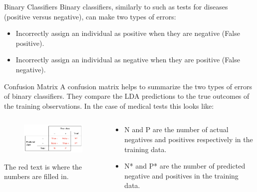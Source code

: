 \documentclass[
  ignorenonframetext,
  aspectratio=169,
]{beamer}
\begin{document}
\begin{frame}{Binary Classifiers}
\protect\hypertarget{binary-classifiers}{}
Binary classifiers, similarly to such as tests for diseases (positive
versus negative), can make two types of errors:

\begin{itemize}
\item
  Incorrectly assign an individual as positive when they are negative
  (False positive).
\item
  Incorrectly assign an individual as negative when they are positive
  (False negative).
\end{itemize}
\end{frame}

\begin{frame}{Confusion Matrix}
\protect\hypertarget{confusion-matrix}{}
A confusion matrix helps to summarize the two types of errors of binary
classifiers. They compare the LDA predictions to the true outcomes of
the training observations. In the case of medical tests this looks like:

\begin{columns}[T]
\begin{column}{0.6\textwidth}
\begin{figure}

{\centering \includegraphics[width=3.33333in,height=\textheight]{images/confusionmatrix.png}

}

\end{figure}

The red text is where the numbers are filled in.
\end{column}

\begin{column}{0.4\textwidth}
\begin{itemize}
\item
  N and P are the number of actual negatives and positives respectively
  in the training data.
\item
  N* and P* are the number of predicted negative and positives in the
  training data.
\end{itemize}
\end{column}
\end{columns}
\end{frame}
\end{document}
